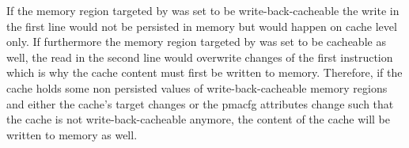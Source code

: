 If the memory region targeted by  was set to be write-back-cacheable the write in the first line would not be persisted in memory but would happen on cache level only.
If furthermore the memory region targeted by  was set to be cacheable as well, the read in the second line would overwrite changes of the first instruction which is why the cache content must first be written to memory.
Therefore, if the cache holds some non persisted values of write-back-cacheable memory regions and either the cache's target changes or the \gls{pmacfg} attributes change such that the cache is not write-back-cacheable anymore, the content of the cache will be written to memory as well.
